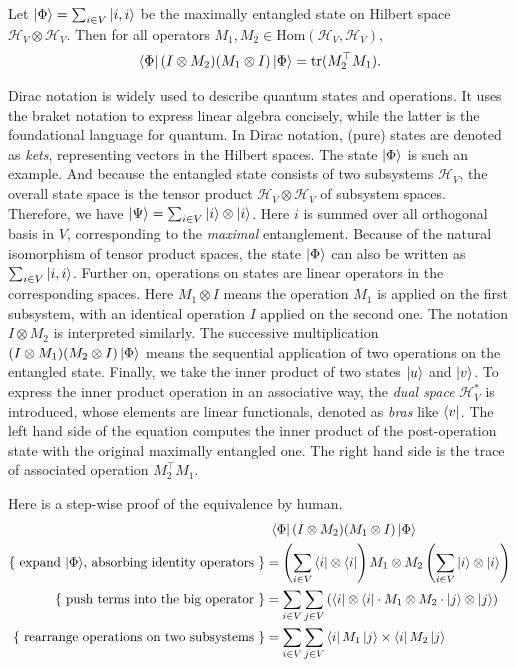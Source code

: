 \documentclass[manuscript, review, timestamp]{acmart}
\begin{document}
\begin{example}
  Let $\ket{\Phi} = \sum_{i \in V}\ket{i, i}$ be the maximally entangled state on Hilbert space $\mathcal{H}_V\otimes\mathcal{H}_V$. Then for all operators $M_1, M_2 \in \mathrm{Hom}(\mathcal{H}_V, \mathcal{H}_V)$,
  $$
  \bra{\Phi} (I \otimes M_2) (M_1 \otimes I) \ket{\Phi} = \mathrm{tr}(M_2^\top M_1).
  $$
\end{example}

Dirac notation is widely used to describe quantum states and operations. It uses the braket notation to express linear algebra concisely, while the latter is the foundational language for quantum.
In Dirac notation, (pure) states are denoted as \textit{kets}, representing vectors in the Hilbert spaces. The state $\ket{\Phi}$ is such an example. And because the entangled state consists of two subsystems $\mathcal{H}_V$, the overall state space is the tensor product $\mathcal{H}_V \otimes \mathcal{H}_V$ of subsystem spaces.
Therefore, we have $\ket{\Psi} = \sum_{i\in V} \ket{i} \otimes \ket{i}$. Here $i$ is summed over all orthogonal basis in $V$, corresponding to the \textit{maximal} entanglement. Because of the natural isomorphism of tensor product spaces, the state $\ket{\Phi}$ can also be written as $\sum_{i \in V} \ket{i, i}$. 
Further on, operations on states are linear operators in the corresponding spaces. Here $M_1 \otimes I$ means the operation $M_1$ is applied on the first subsystem, with an identical operation $I$ applied on the second one. The notation $I \otimes M_2$ is interpreted similarly. The successive multiplication $(I\otimes M_1)(M_2 \otimes I)\ket{\Phi}$ means the sequential application of two operations on the entangled state.
Finally, we take the inner product of two states $\ket{u}$ and $\ket{v}$. To express the inner product operation in an associative way, the \textit{dual space} $\mathcal{H}_V^*$ is introduced, whose elements are linear functionals, denoted as \textit{bras} like $\bra{v}$. The left hand side of the equation computes the inner product of the post-operation state with the original maximally entangled one. The right hand side is the trace of associated operation $M_2^\top M_1$.

Here is a step-wise proof of the equivalence by human.
\begin{align}
    & \ \bra{\Phi} (I \otimes M_2) (M_1 \otimes I) \ket{\Phi} \notag \\
    \text{\{ expand $\ket{\Phi}$, absorbing identity operators \}} & = \left(\sum_{i\in V} \bra{i} \otimes \bra{i}\right) M_1 \otimes M_2 \left(\sum_{i \in V} \ket{i} \otimes \ket{i}\right) \\
    \text{\{ push terms into the big operator \}} & = \sum_{i\in V} \sum_{j \in V} \left( \bra{i} \otimes \bra{i} \cdot  M_1 \otimes M_2 \cdot \ket{j} \otimes \ket{j} \right) \\
    \text{\{ rearrange operations on two subsystems \}} & = \sum_{i\in V} \sum_{j \in V} \bra{i} M_1 \ket{j} \times \bra{i} M_2 \ket{j}
\end{align}
\end{document}
